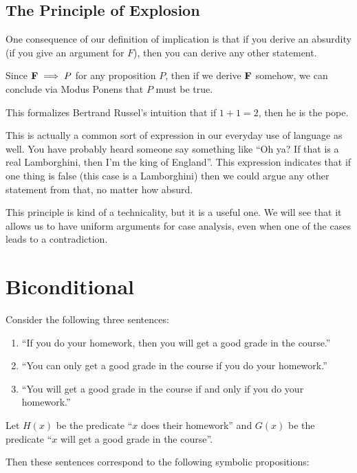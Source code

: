 \subsection{The Principle of Explosion}

One consequence of our definition of implication is that if you derive an absurdity (if you give an argument for $F$), then you can derive any other statement.  

Since $\textbf{\textrm{F}} \implies P$ for any proposition $P$, then if we derive $\textbf{\textrm{F}}$ somehow, we can conclude via Modus Ponens that $P$ must be true.

This formalizes Bertrand Russel's intuition that if $1+1 = 2$, then he is the pope.

This is actually a common sort of expression in our everyday use of language as well.  You have probably heard someone say something like ``Oh ya?  If that is a real Lamborghini, then I'm the king of England''.  This expression indicates that if one thing is false (this case is a Lamborghini) then we could argue any other statement from that, no matter how absurd.

This principle is kind of a technicality, but it is a useful one.  We will see that it allows us to have uniform arguments for case analysis, even when one of the cases leads to a contradiction.

\section{Biconditional}

Consider the following three sentences:

\begin{enumerate}

\item ``If you do your homework, then you will get a good grade in the course.''

\item  ``You can only get a good grade in the course if you do your homework.''

\item ``You will get a good grade in the course if and only if you do your homework.''

\end{enumerate}

Let $H(x)$ be the predicate ``$x$ does their homework'' and $G(x)$ be the predicate ``$x$ will get a good grade in the course''.

Then these sentences correspond to the following symbolic propositions:

